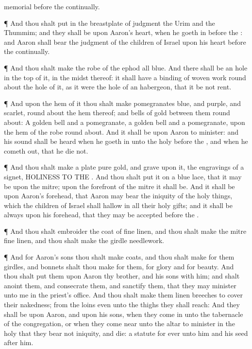 {memorial
before the
{}
continually.
\par }{\PP {}¶ And thou shalt
put in the
breastplate of
judgment the
Urim and the
Thummim; and they shall be upon
Aaron’s
heart, when he
goeth in
before the
{}: and
Aaron shall
bear the
judgment of the
children of
Israel upon his
heart
before the
{}
continually.
\par }{\PP {}¶ And thou shalt
make the
robe of the
ephod
all
{}
blue.
And there shall be an
hole in the
top of it, in the
midst thereof: it shall have a
binding of
woven
work round
about the
hole of it, as it were the
hole of an
habergeon, that it be not
rent.
\par }{\PP {}¶ And
{} upon the
hem of it thou shalt
make
pomegranates
{}
blue, and
{}
purple, and
{}
scarlet, round
about the
hem thereof; and
bells of
gold
between them round
about:
A
golden
bell and a
pomegranate, a
golden
bell and a
pomegranate, upon the
hem of the
robe round
about.
And it shall be upon
Aaron to
minister: and his
sound shall be
heard when he
goeth in unto the
holy
{}
before the
{}, and when he
cometh out, that he
die not.
\par }{\PP {}¶ And thou shalt
make a
plate
{}
pure
gold, and
grave upon it,
{} the
engravings of a
signet,
HOLINESS TO THE
{}.
And thou shalt
put it on a
blue
lace, that it may be upon the
mitre; upon the
forefront of the
mitre it shall be.
And it shall be upon
Aaron’s
forehead, that
Aaron may
bear the
iniquity of the holy
things, which the
children of
Israel shall
hallow in all their
holy
gifts; and it shall be
always upon his
forehead, that they may be
accepted
before the
{}.
\par }{\PP {}¶ And thou shalt
embroider the
coat of fine
linen, and thou shalt
make the
mitre
{} fine
linen, and thou shalt
make the
girdle
{}
needlework.
\par }{\PP {}¶ And for
Aaron’s
sons thou shalt
make
coats, and thou shalt
make for them
girdles, and
bonnets shalt thou
make for them, for
glory and for
beauty.
And thou shalt
put them upon
Aaron thy
brother, and his
sons with him; and shalt
anoint them, and
consecrate them, and
sanctify them, that they may minister unto me in the
priest’s office.
And thou shalt
make them
linen
breeches to
cover their
nakedness; from the
loins even unto the
thighs they shall reach:
And they shall be upon
Aaron, and upon his
sons, when they
come in unto the
tabernacle of the
congregation, or when they come
near unto the
altar to
minister in the
holy
{} that they
bear not
iniquity, and
die:
{} a
statute for
ever unto him and his
seed
after him.

}
